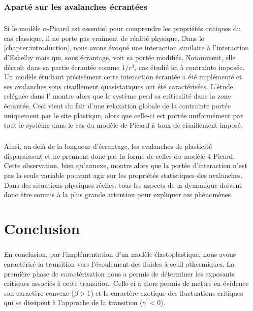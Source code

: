 \subsubsection{Aparté sur les avalanches écrantées}

\subparagraph{}Si le modèle $\alpha$-Picard est essentiel pour comprendre les propriétés critiques du cas classique, il ne porte pas vraiment de réalité physique. Dans le \autoref{chapter:introduction}, nous avons évoqué une interaction similaire à l'interaction d'Eshelby mais qui, sous écrantage, voit sa portée modifiée. Notamment, elle décroît dans sa partie écrantée comme $1/r^4$, cas étudié ici à contrainte imposée. Un modèle étudiant précisément cette interaction écrantée a été implémenté et ses avalanches sous cisaillement quasistatiques ont été caractérisées. L'étude reléguée dans l' montre alors que le système perd sa criticalité dans la zone écrantée. Ceci vient du fait d'une relaxation globale de la contrainte portée uniquement par le site plastique, alors que celle-ci est portée uniformément par tout le système dans le cas du modèle de Picard à taux de cisaillement imposé.

\subparagraph{}Ainsi, au-delà de la longueur d'écrantage, les avalanches de plasticité disparaissent et ne prennent donc pas la forme de celles du modèle 4-Picard. Cette observation, bien qu'annexe, montre alors que la portée d'interaction n'est pas la seule variable pouvant agir sur les propriétés statistiques des avalanches. Dans des situations physiques réelles, tous les aspects de la dynamique doivent donc être soumis à la plus grande attention pour expliquer ces phénomènes.

\section{Conclusion}

\subparagraph{}En conclusion, par l'implémentation d'un modèle élastoplastique, nous avons caractérisé la transition vers l'écoulement des fluides à seuil athermiques. La première phase de caractérisation nous a permis de déterminer les exposants critiques associés à cette transition. Celle-ci a alors permis de mettre en évidence son caractère convexe ($\beta >1$) et le caractère exotique des fluctuations critiques qui se dissipent à l'approche de la transition ($\gamma^\prime<0$). 


